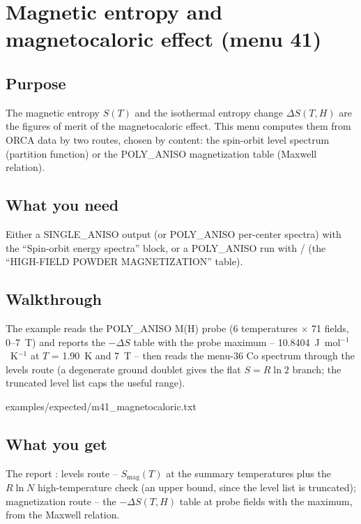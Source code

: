 \chapter{Magnetic entropy and magnetocaloric effect (menu 41)}
\label{ch:menu41}

\section{Purpose}

The magnetic entropy $S(T)$ and the isothermal entropy change
$\Delta S(T, H)$ are the figures of merit of the magnetocaloric effect.
This menu computes them from ORCA data by two routes, chosen by content:
the spin-orbit level spectrum (partition function) or the POLY\_ANISO
magnetization table (Maxwell relation).

\section{What you need}

Either a SINGLE\_ANISO output (or POLY\_ANISO per-center spectra) with the
``Spin-orbit energy spectra'' block, or a POLY\_ANISO run with
/ (the ``HIGH-FIELD POWDER MAGNETIZATION'' table).

\section{Walkthrough}

The example reads the POLY\_ANISO M(H) probe (6 temperatures $\times$ 71
fields, 0--7~T) and reports the $-\Delta S$ table with the probe maximum
-- 10.8404~J~mol$^{-1}$~K$^{-1}$ at $T$ = 1.90~K and 7~T -- then reads the
menu-36 Co spectrum through the levels route (a degenerate ground doublet
gives the flat $S = R\ln 2$ branch; the truncated level list caps the
useful range).


  {examples/expected/m41_magnetocaloric.txt}

\section{What you get}

The report : levels route -- $S_{\mathrm{mag}}(T)$ at
the summary temperatures plus the $R\ln N$ high-temperature check (an
upper bound, since the level list is truncated); magnetization route --
the $-\Delta S(T, H)$ table at probe fields with the maximum, from the
Maxwell relation.


